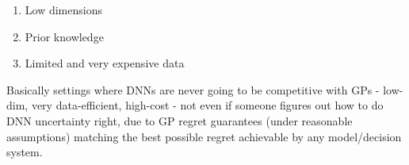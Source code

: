 \begin{enumerate}
    \item Low dimensions
    \item Prior knowledge
    \item Limited and very expensive data
\end{enumerate}

Basically settings where DNNs are never going to be competitive with GPs - low-dim, very data-efficient, high-cost - not even if someone figures out how to do DNN uncertainty right, due to GP regret guarantees (under reasonable assumptions) matching the best possible regret achievable by any model/decision system.



